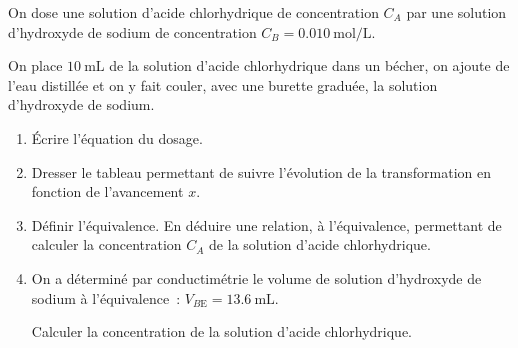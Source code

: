 On dose une solution d'acide chlorhydrique de concentration $C_{A}$ par une
solution d'hydroxyde de sodium de concentration
$C_{B}=\qty{0.010}{\mol\per\L}$.

On place $\qty{10}{\mL}$ de la solution d'acide chlorhydrique dans un bécher, on
ajoute de l'eau distillée et on y fait couler, avec une burette graduée, la
solution d'hydroxyde de sodium.
\begin{enumerate}
    \item Écrire l'équation du dosage.
    \item Dresser le tableau permettant de suivre l'évolution de la
          transformation en fonction de l'avancement $x$.
    \item Définir l'équivalence. En déduire une relation, à l'équivalence,
          permettant de calculer la concentration $C_{A}$ de la solution d'acide
          chlorhydrique.
    \item On a déterminé par conductimétrie le volume de solution d'hydroxyde de
          sodium à l'équivalence~: $V_{B\mathrm{E}}=\qty{13.6}{\mL}$.

          Calculer la concentration de la solution d'acide chlorhydrique.
\end{enumerate}

